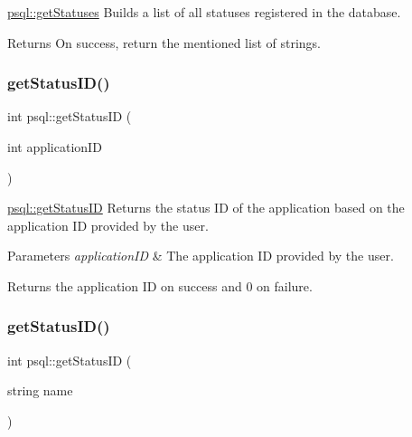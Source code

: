 \hyperlink{classpsql_a14854d28aabc7e658aea87a7b8b52e5c}{psql\+::get\+Statuses} Builds a list of all statuses registered in the database. 

\begin{DoxyReturn}{Returns}
On success, return the mentioned list of strings. 
\end{DoxyReturn}
\mbox{\label{classpsql_a9c02c92c09cb60c35d24375673b7df06}} 
\subsubsection{\texorpdfstring{get\+Status\+I\+D()}{getStatusID()}\hspace{0.1cm}{\footnotesize\ttfamily [1/2]}}
{\footnotesize\ttfamily int psql\+::get\+Status\+ID (\begin{DoxyParamCaption}\item[{int}]{application\+ID }\end{DoxyParamCaption})}



\hyperlink{classpsql_a9c02c92c09cb60c35d24375673b7df06}{psql\+::get\+Status\+ID} Returns the status ID of the application based on the application ID provided by the user. 


\begin{DoxyParams}{Parameters}
{\em application\+ID} & The application ID provided by the user. \\
\hline
\end{DoxyParams}
\begin{DoxyReturn}{Returns}
the application ID on success and 0 on failure. 
\end{DoxyReturn}
\mbox{\label{classpsql_a9d13aebcb6d151719769207238865e75}} 
\subsubsection{\texorpdfstring{get\+Status\+I\+D()}{getStatusID()}\hspace{0.1cm}{\footnotesize\ttfamily [2/2]}}
{\footnotesize\ttfamily int psql\+::get\+Status\+ID (\begin{DoxyParamCaption}\item[{string}]{name }\end{DoxyParamCaption})}



